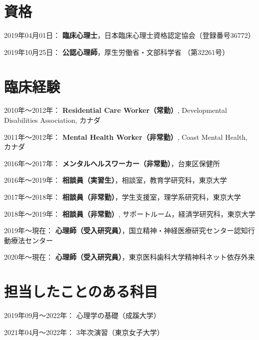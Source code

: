 \documentclass{article}
\begin{document}
\section{資格}
\begin{description}
	\item 2019年04月01日： \textbf{臨床心理士}，日本臨床心理士資格認定協会（登録番号36772）
	\item 2019年10月25日： \textbf{公認心理師}，厚生労働省・文部科学省 （第32261号）
\end{description}

\section{臨床経験}
	\begin{description}
	\item 2010年〜2012年： \textbf{Residential Care Worker（常勤）}, Developmental Disabilities Association, カナダ
	\item 2011年〜2012年： \textbf{Mental Health Worker（非常勤）}, Coast Mental Health, カナダ
	\item 2016年〜2017年： \textbf{メンタルヘルスワーカー（非常勤）}，台東区保健所
	\item 2016年〜2019年： \textbf{相談員（実習生）}，相談室，教育学研究科，東京大学
	\item 2017年〜2018年： \textbf{相談員（非常勤）}，学生支援室，理学系研究科，東京大学
	\item 2018年〜2019年： \textbf{相談員（非常勤）}, サポートルーム，経済学研究科，東京大学
	\item 2019年〜現在： \textbf{心理師（受入研究員）}，国立精神・神経医療研究センター認知行動療法センター
	\item 2020年〜現在： \textbf{心理師（受入研究員）}，東京医科歯科大学精神科ネット依存外来
	\end{description}

\section{担当したことのある科目}
\begin{description}
	\item 2019年09月～2022年： 心理学の基礎（成蹊大学）
	\item 2021年04月〜2022年： 3年次演習（東京女子大学）
\end{description}
\end{document}
